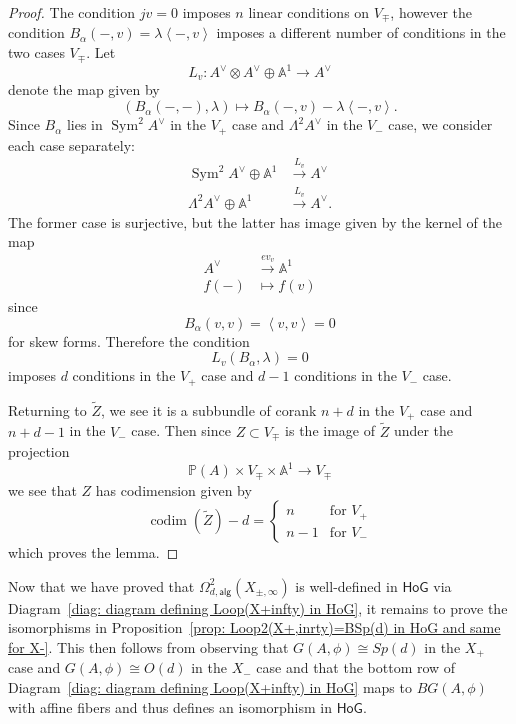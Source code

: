 \message{ !name(Bryan-Vakil.tex)}\documentclass{amsart}
\theoremstyle{definition}
\renewcommand{\AA} {{\mathbb A}}
\newcommand{\HoG}{\textsf{HoG}}
\newcommand{\PP}{\mathbb{P}}
\newcommand{\Sym}{\operatorname{Sym}}
\newcommand{\alg}{\mathsf{alg}}
\newcommand{\LoopTwo}{\Omega^{2}_{d,\alg}}
\begin{document}
\begin{proof}
The condition $jv=0$ imposes $n$ linear conditions on $V_{\mp}$,
however the condition $B_{\alpha}(-,v) = \lambda \left\langle -,v
\right\rangle$ imposes a different number of conditions in the two
cases $V_{\mp}$. Let 
\[
L_{v}: A^{\vee}\otimes A^{\vee}\oplus \AA^{1} \to A^{\vee}
\]
denote the map given by 
\[
(B_{\alpha}(-,-),\lambda )\mapsto B_{\alpha}(-,v)-\lambda \left\langle
-,v \right\rangle .
\]
Since $B_{\alpha}$ lies in $\Sym^{2}A^{\vee}$ in the $V_{+}$ case and
$\Lambda^{2}A^{\vee}$ in the $V_{-}$ case, we consider each case
separately: 
\begin{align*}
\Sym^{2}A^{\vee} \oplus \AA^{1} &\xrightarrow{L_{v}}A^{\vee}\\
\Lambda ^{2}A^{\vee} \oplus \AA^{1} &\xrightarrow{L_{v}}A^{\vee}.
\end{align*}
The former case is surjective, but the latter has image given by the
kernel of the map
\begin{align*}
A^{\vee}&\xrightarrow{ev_{v}} \AA^{1} \\
f(-) &\mapsto f(v)
\end{align*}
since 
\[
B_{\alpha}(v,v)=\left\langle v,v \right\rangle = 0
\]
for skew forms. Therefore the condition 
\[
L_{v}(B_{\alpha},\lambda )=0
\]
imposes $d$ conditions in the $V_{+}$ case and $d-1$ conditions in the
$V_{-}$ case. 

Returning to $\tilde{Z}$, we see it is a subbundle of corank $n+d$ in
the $V_{+}$ case and $n+d-1$ in the $V_{-}$ case. Then since $Z\subset
V_{\mp}$ is the image of $\tilde{Z}$ under the projection 
\[
\PP (A)\times V_{\mp}\times \AA^{1} \to V_{\mp }
\]
we see that $Z$ has codimension given by 
\[
\operatorname{codim}(\tilde{Z})-d = \begin{cases}
n&\text{for $V_{+}$}\\
n-1&\text{for $V_{-}$}
\end{cases}
\]
which proves the lemma.
\end{proof}
Now that we have proved that $\LoopTwo (X_{\pm,\infty })$ is
well-defined in $\HoG$ via Diagram~\eqref{diag: diagram defining
Loop(X+infty) in HoG}, it remains to prove the isomorphisms in
Proposition~\ref{prop: Loop2(X+,inrty)=BSp(d) in HoG and same for
X-}. This
then follows from observing that $G(A,\phi )\cong Sp(d)$ in the $X_{+}$
case and $G(A,\phi )\cong O(d)$ in the $X_{-}$ case and that the
bottom row of Diagram~\eqref{diag: diagram defining Loop(X+infty) in
HoG} maps to $BG(A,\phi )$ with affine fibers and thus defines an
isomorphism in $\HoG$. 
\end{document}
